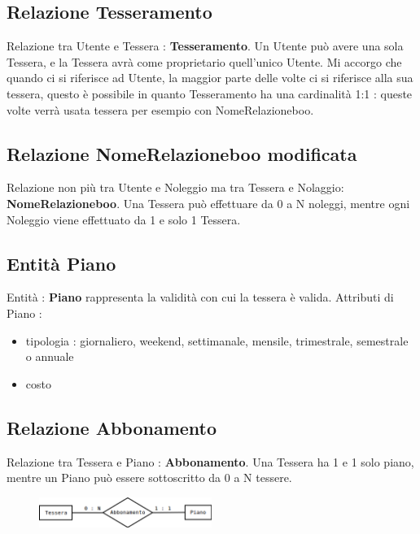 \documentclass[a4paper,twoside]{article}
\begin{document}
\subsection{Relazione Tesseramento}
Relazione tra Utente e Tessera : \textbf{Tesseramento}.\newline
Un Utente può avere una sola Tessera, e la Tessera avrà come proprietario quell'unico Utente.\newline
Mi accorgo che quando ci si riferisce ad Utente, la maggior parte delle volte ci si riferisce alla sua tessera, questo è possibile in quanto Tesseramento ha una cardinalità 1:1 : queste volte verrà usata tessera per esempio con NomeRelazioneboo.

\subsection{Relazione NomeRelazioneboo modificata}
Relazione non più tra Utente e Noleggio ma tra Tessera e Nolaggio: \textbf{NomeRelazioneboo}.\newline
Una Tessera può effettuare da 0 a N noleggi, mentre ogni Noleggio viene effettuato da 1 e solo 1 Tessera.

\subsection{Entità Piano}
Entità : \textbf{Piano} rappresenta la validità con cui la tessera è valida.\newline
Attributi di Piano :
\begin{itemize}
 \item tipologia : giornaliero, weekend, settimanale, mensile, trimestrale, semestrale o annuale
 \item costo
\end{itemize}

\subsection{Relazione Abbonamento}
Relazione tra Tessera e Piano : \textbf{Abbonamento}.\newline
Una Tessera ha 1 e 1 solo piano, mentre un Piano può essere sottoscritto da 0 a N tessere.

\begin{figure}[h]
 \centering
  \includegraphics[width=0.5\textwidth]{Immagini/ConAbbonamento01}
\caption{}
\end{figure} 
\end{document}
